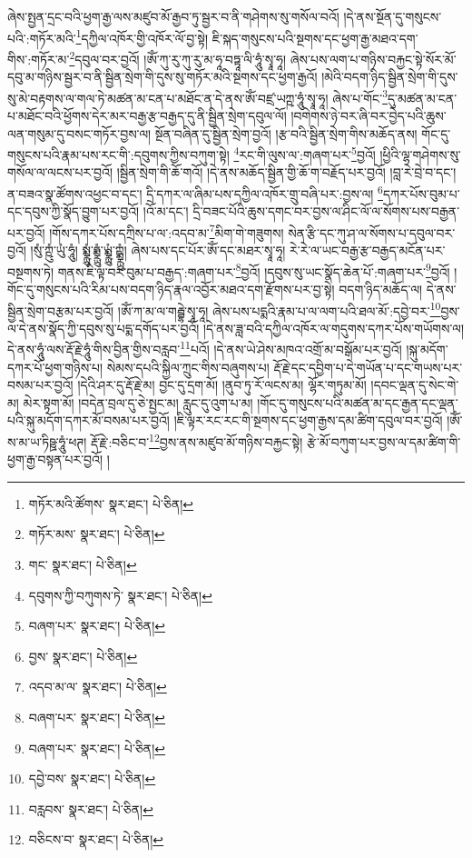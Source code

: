 ཞེས་སྤྱན་དྲང་བའི་ཕྱག་རྒྱ་ལས་མཛུབ་མོ་རྒྱབ་ཏུ་སྦྱར་བ་ནི་གཤེགས་སུ་གསོལ་བའོ། །དེ་ནས་སྔོན་དུ་གསུངས་པའི་:གཏོར་མའི་\footnote{གཏོར་མའི་ཚོགས་  སྣར་ཐང་།  པེ་ཅིན། }དཀྱིལ་འཁོར་གྱི་འཁོར་ལོ་བྱ་སྟེ། ཇི་སྐད་གསུངས་པའི་སྔགས་དང་ཕྱག་རྒྱ་མཐའ་དག་གིས་:གཏོར་མ་\footnote{གཏོར་མས་  སྣར་ཐང་།  པེ་ཅིན། }དབུལ་བར་བྱའོ། །ཨོཾ་ཀུ་རུ་ཀུ་རུ་མ་ཧཱ་བཏྟཱ་ལི་ཧཱུཾ་སྭཱ་ཧཱ། ཞེས་པས་ལག་པ་གཉིས་བརྐྱང་སྟེ་སོར་མོ་དབུ་མ་གཉིས་སྦྱར་བ་ནི་སྦྱིན་སྲེག་གི་དུས་སུ་གཏོར་མའི་སྔགས་དང་ཕྱག་རྒྱའོ། །མེའི་བདག་ཉིད་སྦྱིན་སྲེག་གི་དུས་སུ་མེ་བརྟགས་ལ་གལ་ཏེ་མཚན་མ་ངན་པ་མཐོང་ན་དེ་ནས་ཨོཾ་བཛྲ་ཡཀྵ་ཧཱུཾ་སྭཱ་ཧཱ། ཞེས་པ་གོང་\footnote{གང་  སྣར་ཐང་།  པེ་ཅིན། }དུ་མཚན་མ་ངན་པ་མཐོང་བའི་ཕྱོགས་དེར་མར་བརྒྱ་རྩ་བརྒྱད་དུ་ནི་སྦྱིན་སྲེག་དབུལ་ལོ། །བགེགས་ཉེ་བར་ཞི་བར་བྱེད་པའི་ཆུས་ལན་གསུམ་དུ་བསང་གཏོར་བྱས་ལ། སྔོན་བཞིན་དུ་སྦྱིན་སྲེག་བྱའོ། །རྩ་བའི་སྦྱིན་སྲེག་གིས་མཆོད་ནས། གོང་དུ་གསུངས་པའི་རྣམ་པས་རང་གི་:དབུགས་ཀྱིས་བཀུག་སྟེ། \footnote{དབུགས་ཀྱི་བཀུགས་ཏེ་  སྣར་ཐང་།  པེ་ཅིན། }རང་གི་ལུས་ལ་:གཞག་པར་\footnote{བཞག་པར་  སྣར་ཐང་།  པེ་ཅིན། }བྱའོ། །ཕྱིའི་ལྷ་གཤེགས་སུ་གསོལ་ལ་ལངས་པར་བྱའོ། །སྦྱིན་སྲེག་གི་ཆོ་གའོ། །དེ་ནས་མཆོད་སྦྱིན་གྱི་ཆོ་ག་བརྗོད་པར་བྱའོ། །བླ་རེ་བྲེ་བ་དང་། ན་བཟའ་སྣ་ཚོགས་འཕྱང་བ་དང་། དྲི་དཀར་ལ་ཞིམ་པས་དཀྱིལ་འཁོར་གྲུ་བཞི་པར་:བྱས་ལ། \footnote{བྱས་  སྣར་ཐང་།  པེ་ཅིན། }དཀར་པོས་བུམ་པ་དང་དབུས་ཀྱི་སྣོད་བྱུག་པར་བྱའོ། །འོ་མ་དང་། དྲི་བཟང་པོའི་ཆུས་དགང་བར་བྱས་ལ་ཤིང་ལོ་ལ་སོགས་པས་བརྒྱན་པར་བྱའོ། །གོས་དཀར་པོས་དཀྲིས་པ་ལ་:འདབ་མ་\footnote{འདབ་མ་ལ་  སྣར་ཐང་།  པེ་ཅིན། }མིག་གེ་གཟུགས། སེན་རྩི་དང་ཀུ་ཤ་ལ་སོགས་པ་དབུལ་བར་བྱའོ། །སུཾ་ཀྵུཾ་ཡུཾ་ཧཱུཾ། སྨྼྻུཾ་ཧྨྼྻུཾ་ཡྨྼྻུཾ་ཀྵྨྼྻུཾ། ཞེས་པས་དང་པོར་ཨོཾ་དང་མཐར་སྭཱ་ཧཱ། རེ་རེ་ལ་ཡང་བརྒྱ་རྩ་བརྒྱད་མངོན་པར་བསྔགས་ཏེ། གནས་ཇི་ལྟ་བར་བུམ་པ་བརྒྱད་:གཞག་པར་\footnote{བཞག་པར་  སྣར་ཐང་།  པེ་ཅིན། }བྱའོ། །དབུས་སུ་ཡང་སྣོད་ཆེན་པོ་:གཞག་པར་\footnote{བཞག་པར་  སྣར་ཐང་།  པེ་ཅིན། }བྱའོ། །གོང་དུ་གསུངས་པའི་རིམ་པས་བདག་ཉིད་རྣལ་འབྱོར་མཐའ་དག་རྫོགས་པར་བྱ་སྟེ། བདག་ཉིད་མཆོད་ལ། དེ་ནས་སྦྱིན་སྲེག་བརྩམ་པར་བྱའོ། །ཨོཾ་ཀ་མ་ལ་གརྦྷེ་སྭཱ་ཧཱ། ཞེས་པས་པདྨའི་རྣམ་པ་ལ་ལག་པའི་ཐལ་མོ་:དབྱེ་བར་\footnote{དབྱེ་བས་  སྣར་ཐང་།  པེ་ཅིན། }བྱས་ལ་དེ་ནས་སྣོད་ཀྱི་དབུས་སུ་པདྨ་དགོད་པར་བྱའོ། །དེ་ནས་ཟླ་བའི་དཀྱིལ་འཁོར་ལ་གདུགས་དཀར་པོས་གཡོགས་ལ། དེ་ནས་ཧཱུཾ་ལས་རྡོ་རྗེ་ཧཱུཾ་གིས་བྱིན་གྱིས་བརླབ་\footnote{བརླབས་  སྣར་ཐང་།  པེ་ཅིན། }པའོ། །དེ་ནས་ཡེ་ཤེས་མཁའ་འགྲོ་མ་བསྒོམ་པར་བྱའོ། །སྐུ་མདོག་དཀར་པོ་ཕྱག་གཉིས་པ། སེམས་དཔའི་སྐྱིལ་ཀྲུང་གིས་བཞུགས་པ། རྡོ་རྗེ་དང་དབྱིག་པ་དེ་གཡོན་པ་དང་གཡས་པར་བསམ་པར་བྱའོ། །དེའི་ཤར་དུ་རྡོ་རྗེ་མ། བྱང་དུ་དྲག་མོ། །ནུབ་ཏུ་རོ་ལངས་མ། ལྷོར་གཏུམ་མོ། །དབང་ལྡན་དུ་སེང་གེ་མ། མེར་སྟག་མོ། །བདེན་བྲལ་དུ་ཅེ་སྤྱང་མ། རླུང་དུ་འུག་པ་མ། །གོང་དུ་གསུངས་པའི་མཚན་མ་དང་རྒྱན་དང་ལྡན་པའི་སྐུ་མདོག་དཀར་མོ་བསམ་པར་བྱའོ། །ཇི་ལྟར་རང་རང་གི་སྔགས་དང་ཕྱག་རྒྱས་དམ་ཚིག་དབུལ་བར་བྱའོ། །ཨོཾ་ས་མ་ཡ་ཏིཥྛ་ཧཱུཾ་ཕཊ། རྡོ་རྗེ་:བཅིང་བ་\footnote{བཅིངས་བ་  སྣར་ཐང་།  པེ་ཅིན། }བྱས་ནས་མཛུབ་མོ་གཉིས་བརྐྱང་སྟེ། རྩེ་མོ་བཀུག་པར་བྱས་ལ་དམ་ཚིག་གི་ཕྱག་རྒྱ་བསྟན་པར་བྱའོ། །
